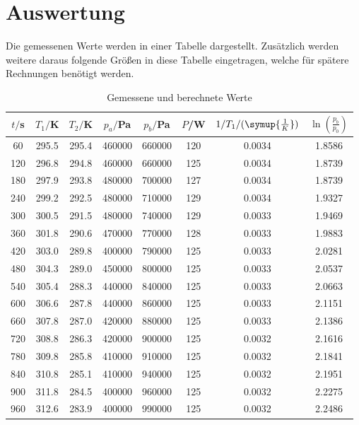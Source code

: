 \section{Auswertung}
\label{sec:Auswertung}
Die gemessenen Werte werden in einer Tabelle dargestellt. Zusätzlich werden weitere
daraus folgende Größen in diese Tabelle eingetragen, welche für spätere Rechnungen
benötigt werden. 
\begin{table}[H]
  \centering
  \caption{Gemessene und berechnete Werte}
  \label{tab:Werte}
  \begin{tabular}{c c c c c c c c}
    \toprule
    $t/$s & $T_1/$K & $T_2/$K & $p_a/$Pa & $p_b/$Pa & $P$/W & $1/T_1/(\symup{\frac{1}{K}})$ & $\ln(\frac{p_b}{p_0})$ \\
    \midrule
      60  &  295.5 &  295.4 & 460000  &  660000 & 120 & 0.0034 & 1.8586 \\
     120  &  296.8 &  294.8 & 460000  &  660000 & 125 & 0.0034 & 1.8739 \\
     180  &  297.9 &  293.8 & 480000  &  700000 & 127 & 0.0034 & 1.8739 \\
     240  &  299.2 &  292.5 & 480000  &  710000 & 129 & 0.0034 & 1.9327 \\
     300  &  300.5 &  291.5 & 480000  &  740000 & 129 & 0.0033 & 1.9469 \\
     360  &  301.8 &  290.6 & 470000  &  770000 & 128 & 0.0033 & 1.9883 \\
     420  &  303.0 &  289.8 & 400000  &  790000 & 125 & 0.0033 & 2.0281 \\
     480  &  304.3 &  289.0 & 450000  &  800000 & 125 & 0.0033 & 2.0537 \\
     540  &  305.4 &  288.3 & 440000  &  840000 & 125 & 0.0033 & 2.0663 \\
     600  &  306.6 &  287.8 & 440000  &  860000 & 125 & 0.0033 & 2.1151 \\
     660  &  307.8 &  287.0 & 420000  &  880000 & 125 & 0.0033 & 2.1386 \\
     720  &  308.8 &  286.3 & 420000  &  900000 & 125 & 0.0032 & 2.1616 \\
     780  &  309.8 &  285.8 & 410000  &  910000 & 125 & 0.0032 & 2.1841 \\
     840  &  310.8 &  285.1 & 410000  &  940000 & 125 & 0.0032 & 2.1951 \\
     900  &  311.8 &  284.5 & 400000  &  960000 & 125 & 0.0032 & 2.2275 \\
     960  &  312.6 &  283.9 & 400000  &  990000 & 125 & 0.0032 & 2.2486 \\

\end{tabular}
\end{table}
